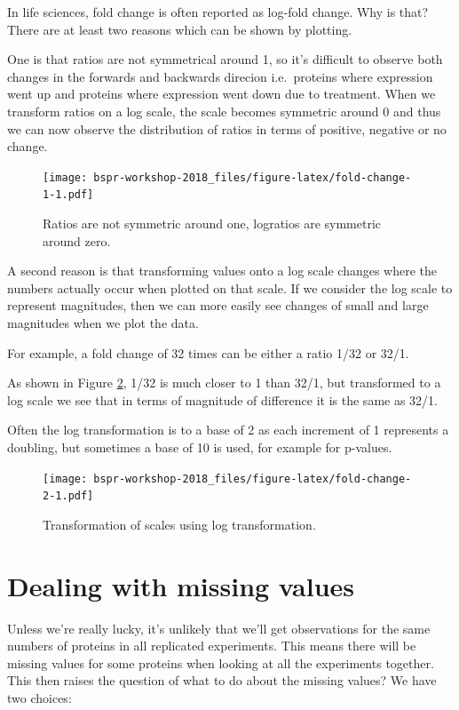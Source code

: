 \documentclass[12pt,]{book}
\theoremstyle{definition}
\theoremstyle{definition}
\theoremstyle{definition}
\theoremstyle{remark}
\begin{document}
In life sciences, fold change is often reported as log-fold change. Why
is that? There are at least two reasons which can be shown by plotting.

One is that ratios are not symmetrical around 1, so it's difficult to
observe both changes in the forwards and backwards direcion
i.e.~proteins where expression went up and proteins where expression
went down due to treatment. When we transform ratios on a log scale, the
scale becomes symmetric around 0 and thus we can now observe the
distribution of ratios in terms of positive, negative or no change.




\begin{figure}
\centering
\texttt{[image: bspr-workshop-2018\_files/figure-latex/fold-change-1-1.pdf]}
\caption{\label{fig:fold-change-1}Ratios are not symmetric around one, logratios are
symmetric around zero.}
\end{figure}

A second reason is that transforming values onto a log scale changes
where the numbers actually occur when plotted on that scale. If we
consider the log scale to represent magnitudes, then we can more easily
see changes of small and large magnitudes when we plot the data.

For example, a fold change of 32 times can be either a ratio 1/32 or
32/1.

As shown in Figure \ref{fig:fold-change-2}, 1/32 is much closer to 1
than 32/1, but transformed to a log scale we see that in terms of
magnitude of difference it is the same as 32/1.

Often the log transformation is to a base of 2 as each increment of 1
represents a doubling, but sometimes a base of 10 is used, for example
for p-values.



\begin{figure}
\centering
\texttt{[image: bspr-workshop-2018\_files/figure-latex/fold-change-2-1.pdf]}
\caption{\label{fig:fold-change-2}Transformation of scales using log transformation.}
\end{figure}

\section{Dealing with missing values}\label{missing-values}

Unless we're really lucky, it's unlikely that we'll get observations for
the same numbers of proteins in all replicated experiments. This means
there will be missing values for some proteins when looking at all the
experiments together. This then raises the question of what to do about
the missing values? We have two choices:
\end{document}
